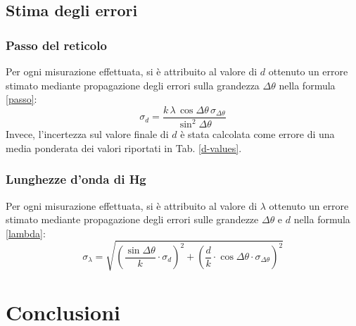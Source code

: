 \documentclass[]{article}
\let\oldsection\section%
\renewcommand{\section}{%
	\renewcommand{\theequation}{\thesection.\arabic{equation}}%
	\oldsection}%
\let\oldsubsection\subsection%
\renewcommand{\subsection}{%
	\renewcommand{\theequation}{\thesubsection.\arabic{equation}}%
	\oldsubsection}%
\begin{document}
    \subsection{Stima degli errori}
    \subsubsection{Passo del reticolo}
    Per ogni misurazione effettuata, si è attribuito al valore di $d$ ottenuto un errore stimato mediante propagazione degli errori sulla grandezza $\Delta \theta$ nella formula \ref{passo}:
    \begin{equation}
        \label{d-error}
        \sigma_d = \frac{k \, \lambda \, \cos{\Delta\theta} \, \sigma_{\Delta \theta}}{\sin^2{\Delta\theta}}
    \end{equation}
    Invece, l'incertezza sul valore finale di $d$ è stata calcolata come errore di una media ponderata dei valori riportati in Tab. \ref{d-values}.
    \label{par:errore_passo}

    \subsubsection{Lunghezze d'onda di Hg}
    Per ogni misurazione effettuata, si è attribuito al valore di $\lambda$ ottenuto un errore stimato mediante propagazione degli errori sulle grandezze $\Delta \theta$ e $d$ nella formula \ref{lambda}:
    \begin{equation}
        \label{lambda-error}
        \sigma_{\lambda} = \sqrt{\left( \frac{\sin{\Delta\theta}}{k}  \cdot \sigma_d \right)^2 + \left(\frac{d}{k} \cdot \cos{\Delta\theta} \cdot \sigma_{\Delta\theta}\right)^2  } 
    \end{equation}
    \label{par:errore_lambda}

    \section{Conclusioni}
\end{document}
